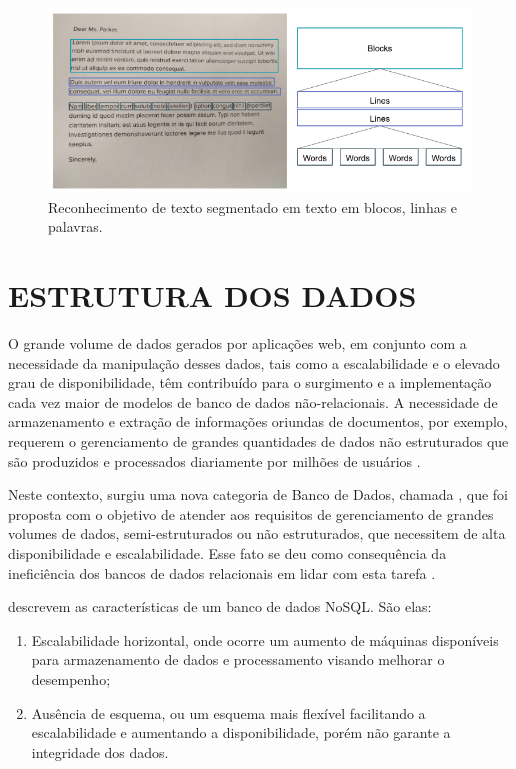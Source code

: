  \begin{figure}[h]
	\centering
	
	\includegraphics[width=1.0\textwidth]{Imagens/estruturatexto} 
	\caption[Reconhecimento de texto segmentado em texto em blocos, linhas e palavras.]{Reconhecimento de texto segmentado em texto em blocos, linhas e palavras.}
	\label{fig:estruturatexto}
\end{figure}

\section{ESTRUTURA DOS DADOS}

O grande volume de dados gerados por aplicações web, em conjunto com a necessidade da manipulação desses dados, tais como a escalabilidade e o elevado grau de disponibilidade, têm contribuído para o surgimento e a implementação cada vez maior de modelos de banco de dados não-relacionais. A necessidade de armazenamento e extração de informações oriundas de documentos, por exemplo, requerem o gerenciamento de grandes quantidades de dados não estruturados que são produzidos e processados diariamente por milhões de usuários \cite{LOSCIO}.

Neste contexto, surgiu uma nova categoria de Banco de Dados, chamada , que foi proposta com o objetivo de atender aos requisitos de gerenciamento de grandes volumes de dados, semi-estruturados ou não estruturados, que necessitem de alta disponibilidade e escalabilidade. Esse fato se deu como consequência da ineficiência dos bancos de dados relacionais em lidar com esta tarefa \cite{LOSCIO}.

 descrevem as características de um banco de dados NoSQL. São elas: 
 \begin{enumerate}
   \item Escalabilidade horizontal, onde ocorre um aumento de máquinas disponíveis para armazenamento de dados e processamento visando melhorar o desempenho;
   \item Ausência de esquema, ou um esquema mais flexível facilitando a escalabilidade e aumentando a disponibilidade, porém não garante a integridade dos dados. 

 \end{enumerate}

